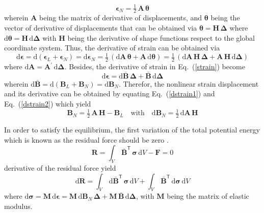 \begin{equation}
\boldsymbol{\epsilon}_N = \tfrac{1}{2} \, {\mathbf{A}} \,  \boldsymbol{\theta}
\end{equation}
wherein ${\mathbf{A}}$ being the matrix of  derivative of displacements, and $\boldsymbol{\theta}$ being the vector of derivative of displacements that can be obtained via $\boldsymbol{\theta} = \mathbf{H} \, \boldsymbol{\Delta} $ where $\mathrm{d} \boldsymbol{\theta} = \mathbf{H} \, \mathrm{d} \boldsymbol{\Delta}$ with $\mathbf{H}$ being the derivative of shape functions respect to the global coordinate system. Thus, the derivative of strain can be obtained via
\begin{equation}
\mathrm{d} \boldsymbol{\epsilon} = \mathrm{d} (\boldsymbol{\epsilon}_L + \boldsymbol{\epsilon}_N) = \mathrm{d} \boldsymbol{\epsilon}_N = \tfrac{1}{2} \, (\mathrm{d} \mathbf{A} \, \boldsymbol{\theta} + \mathbf{A} \, \mathrm{d} \boldsymbol{\theta}) = \tfrac{1}{2} \, (\mathrm{d} \mathbf{A} \, \mathbf{H} \, \boldsymbol{\Delta} + \mathbf{A} \, \mathbf{H} \, \mathrm{d} \boldsymbol{\Delta})
\label{dstrain1}
\end{equation}
where $\mathrm{d} \mathbf{A} = \mathbf{A}^{'} \, \mathrm{d} \boldsymbol{\Delta} $. Besides, the derivative of strain in Eq.~(\ref{strain}) become 
\begin{equation}
\mathrm{d} \boldsymbol{\epsilon} = \mathrm{d} \bar{\mathbf{B}} \, \boldsymbol{\Delta} + \bar{\mathbf{B}} \, \mathrm{d} \boldsymbol{\Delta}
\label{dstrain2}
\end{equation}
wherein $\mathrm{d} \bar{\mathbf{B}} = \mathrm{d} (\mathbf{B}_L + \mathbf{B}_N) = \mathrm{d} \mathbf{B}_N$. Therefor, the nonlinear strain displacement and its derivative can be obtained by equating Eq.~(\ref{dstrain1}) and Eq.~(\ref{dstrain2}) which yield
\begin{equation}
\mathbf{B}_N = \tfrac{1}{2} \, \mathbf{A} \, \mathbf{H} - \mathbf{B}_L \quad \text{with} \quad \mathrm{d} \mathbf{B}_N = \tfrac{1}{2} \, \mathrm{d} \mathbf{A} \, \mathbf{H}
\end{equation} 
 

In order to satisfy the equilibrium, the first variation of the total potential energy which is known as the residual force should be zero \cite{Elseifi98}. 
\begin{equation}
\mathbf{R} = \int_{V} \, \bar{\mathbf{B}}^{\mathsf{T}} \, \boldsymbol{\sigma} \, \mathrm{d} V - \mathbf{F} = 0
\label{residual}
\end{equation}
derivative of the residual force yield 
\begin{equation}
\mathrm{d} \mathbf{R} = \int_{V} \, \mathrm{d} \bar{\mathbf{B}}^{\mathsf{T}} \, \boldsymbol{\sigma} \, \mathrm{d} V + \int_{V} \, \bar{\mathbf{B}}^{\mathsf{T}} \, \mathrm{d} \boldsymbol{\sigma} \, \mathrm{d} V 
\label{diffresidual}
\end{equation}
where $\mathrm{d} \boldsymbol{\sigma} = \mathbf{M} \, \mathrm{d} \boldsymbol{\epsilon} = \mathbf{M} \, \mathrm{d} \mathbf{B}_N \, \boldsymbol{\Delta} + \mathbf{M} \,  \bar{\mathbf{B}} \, \mathrm{d} \boldsymbol{\Delta}$, with $\mathbf{M}$ being the matrix of elastic modulus. 

